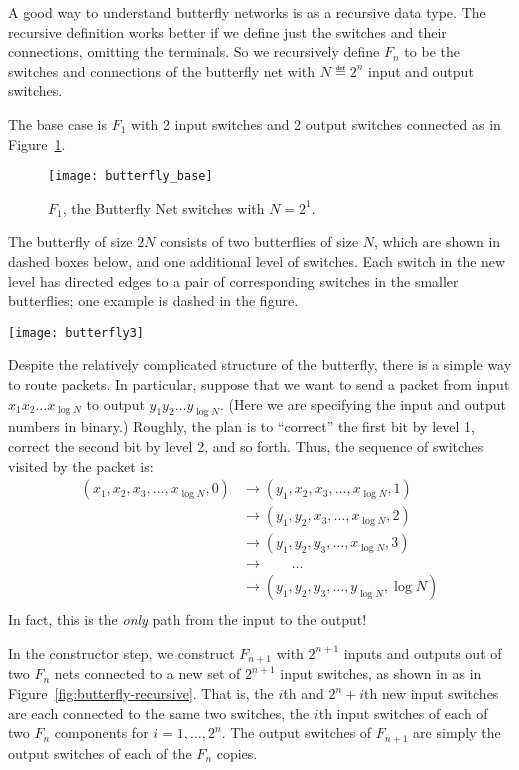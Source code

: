 A good way to understand butterfly networks is as a recursive data
type.  The recursive definition works better if we define just the
switches and their connections, omitting the terminals.  So we
recursively define $F_n$ to be the switches and connections of the
butterfly net with $N \eqdef 2^n$ input and output switches.

The base case is $F_1$ with 2 input switches and 2 output switches
connected as in Figure~\ref{fig:butterfly-base}.

\begin{figure}
\texttt{[image: butterfly\_base]}
\caption{$F_1$, the Butterfly Net switches with $N=2^1$.}
\label{fig:butterfly-base}
\end{figure}

\begin{editingnotes}

The butterfly of size $2N$ consists of two butterflies of size $N$, which
are shown in dashed boxes below, and one additional level of switches.
Each switch in the new level has directed edges to a pair of
corresponding switches in the smaller butterflies; one example is
dashed in the figure.

\texttt{[image: butterfly3]}

Despite the relatively complicated structure of the butterfly, there
is a simple way to route packets.  In particular, suppose that we want
to send a packet from input $x_1 x_2 \dots x_{\log N}$ to output $y_1
y_2 \dots y_{\log N}$.  (Here we are specifying the input and output
numbers in binary.)  Roughly, the plan is to ``correct'' the first bit
by level 1, correct the second bit by level 2, and so forth.  Thus,
the sequence of switches visited by the packet is:
%
\begin{align*}
(x_1, x_2, x_3, \dots, x_{\log N}, 0)
    & \to (y_1, x_2, x_3, \dots, x_{\log N}, 1) \\
    & \to (y_1, y_2, x_3, \dots, x_{\log N}, 2) \\
    & \to (y_1, y_2, y_3, \dots, x_{\log N}, 3) \\
    & \to \qquad \dots \\
    & \to (y_1, y_2, y_3, \dots, y_{\log N}, \log N) \\
\end{align*}
%
In fact, this is the \textit{only} path from the input to the output!
\end{editingnotes}


In the constructor step, we construct $F_{n+1}$ with $2^{n+1}$ inputs and
outputs out of two $F_n$ nets connected to a new set of $2^{n+1}$ input
switches, as shown in as in Figure~\ref{fig:butterfly-recursive}.  That
is, the $i$th and $2^n+i$th new input switches are each connected to the
same two switches, the $i$th input switches of each of two
$F_n$ components for $i=1,\dots,2^n$.  The output switches of $F_{n+1}$
are simply the output switches of each of the $F_n$ copies.

